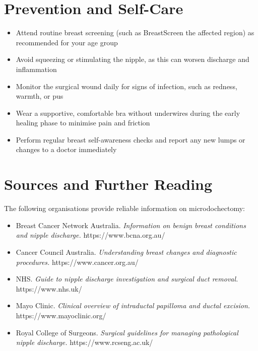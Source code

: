 \section*{Prevention and Self-Care}
\begin{itemize}
    \item Attend routine breast screening (such as BreastScreen the affected region) as recommended for your age group
    \item Avoid squeezing or stimulating the nipple, as this can worsen discharge and inflammation
    \item Monitor the surgical wound daily for signs of infection, such as redness, warmth, or pus
    \item Wear a supportive, comfortable bra without underwires during the early healing phase to minimise pain and friction
    \item Perform regular breast self-awareness checks and report any new lumps or changes to a doctor immediately
\end{itemize}

\section*{Sources and Further Reading}
The following organisations provide reliable information on microdochectomy:

\begin{itemize}
    \item Breast Cancer Network Australia. \textit{Information on benign breast conditions and nipple discharge.} https://www.bcna.org.au/
    \item Cancer Council Australia. \textit{Understanding breast changes and diagnostic procedures.} https://www.cancer.org.au/
    \item NHS. \textit{Guide to nipple discharge investigation and surgical duct removal.} https://www.nhs.uk/
    \item Mayo Clinic. \textit{Clinical overview of intraductal papilloma and ductal excision.} https://www.mayoclinic.org/
    \item Royal College of Surgeons. \textit{Surgical guidelines for managing pathological nipple discharge.} https://www.rcseng.ac.uk/
\end{itemize}
